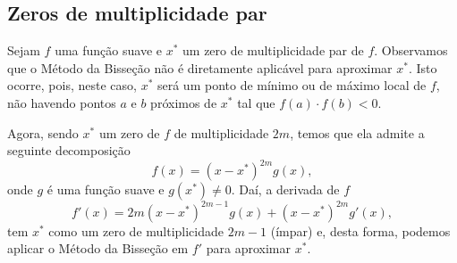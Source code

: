 \subsection{Zeros de multiplicidade par}

Sejam $f$ uma função suave e $x^*$ um zero de multiplicidade par de $f$. Observamos que o Método da Bisseção não é diretamente aplicável para aproximar $x^*$. Isto ocorre, pois, neste caso, $x^*$ será um ponto de mínimo ou de máximo local de $f$, não havendo pontos $a$ e $b$ próximos de $x^*$ tal que $f(a)\cdot f(b) < 0$.

Agora, sendo $x^*$ um zero de $f$ de multiplicidade $2m$, temos que ela admite a seguinte decomposição
\begin{equation}
  f(x) = (x-x^*)^{2m}g(x),
\end{equation}
onde $g$ é uma função suave e $g(x^*)\neq 0$. Daí, a derivada de $f$
\begin{equation}
  f'(x) = 2m(x-x^*)^{2m-1}g(x) + (x-x^*)^{2m}g'(x),
\end{equation}
tem $x^*$ como um zero de multiplicidade $2m-1$ (ímpar) e, desta forma, podemos aplicar o Método da Bisseção em $f'$ para aproximar $x^*$.

